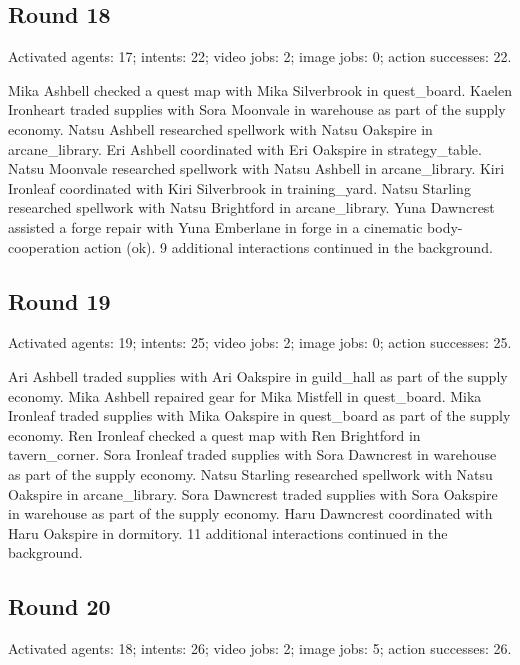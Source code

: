\documentclass[11pt,a4paper]{article}
\begin{document}
\subsection{Round 18}
Activated agents: 17; intents: 22; video jobs: 2; image jobs: 0; action successes: 22.

Mika Ashbell checked a quest map with Mika Silverbrook in quest\_board. Kaelen Ironheart traded supplies with Sora Moonvale in warehouse as part of the supply economy. Natsu Ashbell researched spellwork with Natsu Oakspire in arcane\_library. Eri Ashbell coordinated with Eri Oakspire in strategy\_table. Natsu Moonvale researched spellwork with Natsu Ashbell in arcane\_library. Kiri Ironleaf coordinated with Kiri Silverbrook in training\_yard. Natsu Starling researched spellwork with Natsu Brightford in arcane\_library. Yuna Dawncrest assisted a forge repair with Yuna Emberlane in forge in a cinematic body-cooperation action (ok). 9 additional interactions continued in the background.

\subsection{Round 19}
Activated agents: 19; intents: 25; video jobs: 2; image jobs: 0; action successes: 25.

Ari Ashbell traded supplies with Ari Oakspire in guild\_hall as part of the supply economy. Mika Ashbell repaired gear for Mika Mistfell in quest\_board. Mika Ironleaf traded supplies with Mika Oakspire in quest\_board as part of the supply economy. Ren Ironleaf checked a quest map with Ren Brightford in tavern\_corner. Sora Ironleaf traded supplies with Sora Dawncrest in warehouse as part of the supply economy. Natsu Starling researched spellwork with Natsu Oakspire in arcane\_library. Sora Dawncrest traded supplies with Sora Oakspire in warehouse as part of the supply economy. Haru Dawncrest coordinated with Haru Oakspire in dormitory. 11 additional interactions continued in the background.

\subsection{Round 20}
Activated agents: 18; intents: 26; video jobs: 2; image jobs: 5; action successes: 26.
\end{document}
